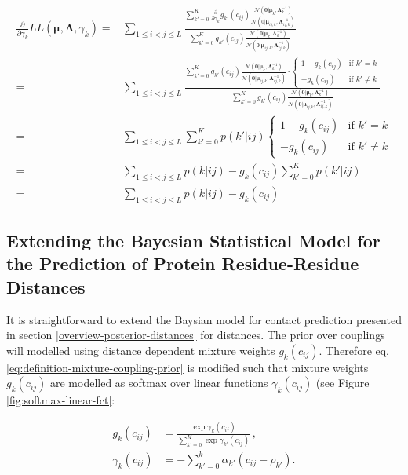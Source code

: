 \documentclass[11pt,a4paper,twoside]{book}
\newcommand{\Gauss}{\mathcal{N}}
\newcommand{\Lijk}{\mathbf{\Lambda}_{ij,k}}
\newcommand{\Lk}{\mathbf{\Lambda}_k}
\newcommand{\muijk}{\mathbf{\mu}_{ij,k}}
\newcommand{\muk}{\mathbf{\mu}_k}
\newcommand{\cij}{c_{ij}}
\theoremstyle{definition}
\theoremstyle{definition}
\theoremstyle{remark}
\begin{document}
\begin{align}
\frac{\partial} {\partial \gamma_k}     L\!L(\mathbf{\mu}, \mathbf{\Lambda}, \gamma_k) 
  =&  \sum_{1\le i<j\le L} \frac{\sum_{k'=0}^K  \frac{\partial}{\partial \gamma_k} g_{k'}(\cij)  
  \frac{\Gauss(\mathbf{0} | \muk, \Lk^{-1})}{\Gauss( 0 | \muijk, \Lijk^{-1})}}
  {\sum_{k'=0}^K g_{k'}(\cij)  \frac{  \Gauss(\mathbf{0} | \muk, \Lk^{-1})}{\Gauss( \mathbf{0} | \muijk, \Lijk^{-1})}} \nonumber \\
  =&  \sum_{1\le i<j\le L} \frac{\sum_{k'=0}^K  g_{k'}(\cij)  
  \frac{  \Gauss(\mathbf{0} | \muk, \Lk^{-1})}{\Gauss( \mathbf{0} | \muijk, \Lijk^{-1})} \cdot 
  \begin{cases} 
   1-g_k(\cij) & \text{if } k' = k \\
   -g_k(\cij)  & \text{if } k' \neq k
  \end{cases}}
  {\sum_{k'=0}^K g_{k'}(\cij)  \frac{  \Gauss(\mathbf{0} | \muk, \Lk^{-1})}{\Gauss( \mathbf{0} | \muijk, \Lijk^{-1})}} \nonumber\\
  =& \sum_{1\le i<j\le L} \sum_{k'=0}^K p(k'|ij) 
  \begin{cases} 
    1-g_k(\cij) & \text{if } k' = k \\
    -g_k(\cij)  & \text{if } k' \neq k 
  \end{cases} \nonumber\\
  =& \sum_{1 \leq i<j\leq L} p(k|ij) - g_k(\cij) \sum_{k'=0}^K p(k'|ij) \nonumber\\
  =& \sum_{1 \leq i<j\leq L} p(k|ij) - g_k(\cij)
\end{align}

\subsection{Extending the Bayesian Statistical Model for the Prediction
of Protein Residue-Residue Distances}\label{bayesian-model-distances}

It is straightforward to extend the Baysian model for contact prediction
presented in section \ref{overview-posterior-distances} for distances.
The prior over couplings will modelled using distance dependent mixture
weights \(g_k(\cij)\). Therefore eq.
\eqref{eq:definition-mixture-coupling-prior} is modified such that mixture
weights \(g_k(\cij)\) are modelled as softmax over linear functions
\(\gamma_k(\cij)\) (see Figure \ref{fig:softmax-linear-fct}:

\begin{align}
      g_k(\cij)        &= \frac{\exp \gamma_k(\cij)}{\sum_{k'=0}^K \exp \gamma_{k'}(\cij)} \, , \\
      \gamma_k(\cij)   &= - \sum_{k'=0}^{k} \alpha_{k'} ( \cij - \rho_{k'}) .
\label{eq:definition-mixture-weights}
\end{align}
\end{document}
